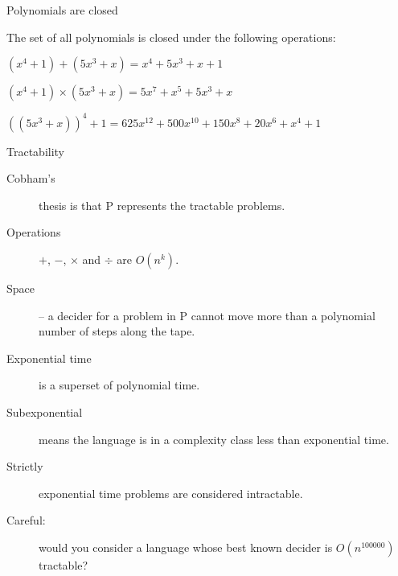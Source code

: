 \begin{frame}[fragile]{Polynomials are closed}
  
  
  The set of all polynomials is closed under the following operations:
  \begin{description}[Multiplication:]
    \setlength\itemsep{4mm}
    \item[Addition:] \( (x^4 + 1) + (5 x^3 + x) = x^4 + 5 x^3 + x + 1 \)
    \item[Multiplication:] \( (x^4 + 1) \times (5 x^3 + x) = 5 x^7 + x^5 + 5 x^3 + x \)
    \item[Composition:] \( ((5 x^3 + x))^4 + 1  = 625x^{12} + 500 x^{10} + 150x^8 + 20x^6 + x^4 +1 \)
  \end{description}


\end{frame}


\begin{frame}{Tractability}
  
  \begin{description}
    \item[Cobham's] thesis is that P represents the tractable problems.
    \item[Operations] $+$, $-$, $\times$ and $\div$ are \(O(n^k)\).
    \item[Space] -- a decider for a problem in P cannot move more than a polynomial number of steps along the tape.
    \item[Exponential time] is a superset of polynomial time.
    \item[Subexponential] means the language is in a complexity class less than exponential time.
    \item[Strictly] exponential time problems are considered intractable.
    \item[Careful:] would you consider a language whose best known decider is $O(n^{100000})$ tractable?
  \end{description}


\end{frame}

